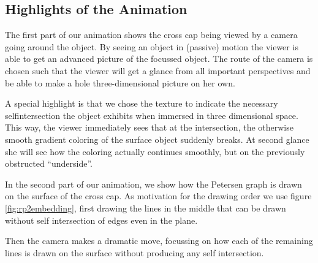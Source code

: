 \documentclass[11pt,            %
               a4paper,         %
               oneside,         %
               DIV12,           %
               fleqn,           %
               halfparskip,     %
               nochapterprefix, %
              ]{scrartcl} %
\theoremstyle{definition}
\begin{document}
\subsection{Highlights of the Animation}

The first part of our animation shows the cross cap being viewed by a
camera going around the object. By seeing an object in (passive)
motion the viewer is able to get an advanced picture of the focussed
object. The route of the camera is chosen such that the viewer will
get a glance from all important perspectives and be able to make a hole
three-dimensional picture on her own.

A special highlight is that we chose the texture to indicate the
necessary selfintersection the object exhibits when immersed
in three dimensional space. This way, the viewer immediately sees that at the
intersection, the otherwise smooth gradient coloring
of the surface object suddenly breaks. At second glance she will see
how the coloring actually continues smoothly, but on the previously
obstructed “underside”.

In the second part of our animation, we show how the Petersen graph is drawn
on the surface of the cross cap. As motivation for the drawing order
we use figure \ref{fig:rp2embedding}, first drawing the lines in the
middle that can be drawn without self intersection of edges even in
the plane.

Then the camera makes a dramatic move, focussing on how each of the
remaining lines is drawn on the surface without producing any self
intersection.


\newpage
\nocite{*}


\end{document}
